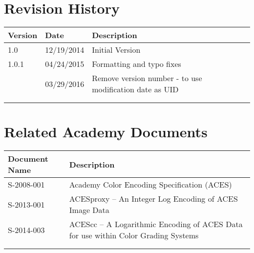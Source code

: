 \prelimsectionformat	%
\chapter{Revision History}

\begin{tabularx}{\linewidth}{|l|l|X|}
    \hline
    Version & Date & Description \\ \hline
    1.0     & 12/19/2014 & Initial Version      \\ \hline
    1.0.1   & 04/24/2015 & Formatting and typo fixes \\ \hline
            & 03/29/2016 & Remove version number - to use modification date as UID \\ \hline
            &      &             \\ \hline
            &      &             \\ \hline
\end{tabularx}

\vspace{0.25in} %
\chapter{Related Academy Documents} %
\begin{tabularx}{\linewidth}{|l|X|}
    \hline
    Document Name & Description  \\ \hline
    S-2008-001 & Academy Color Encoding Specification (ACES) \\ \hline
    S-2013-001 & ACESproxy -- An Integer Log Encoding of ACES Image Data \\ \hline    
    S-2014-003 & ACEScc -- A Logarithmic Encoding of ACES Data for use within Color Grading Systems \\ \hline
    & \\ \hline
    & \\ \hline
\end{tabularx}
